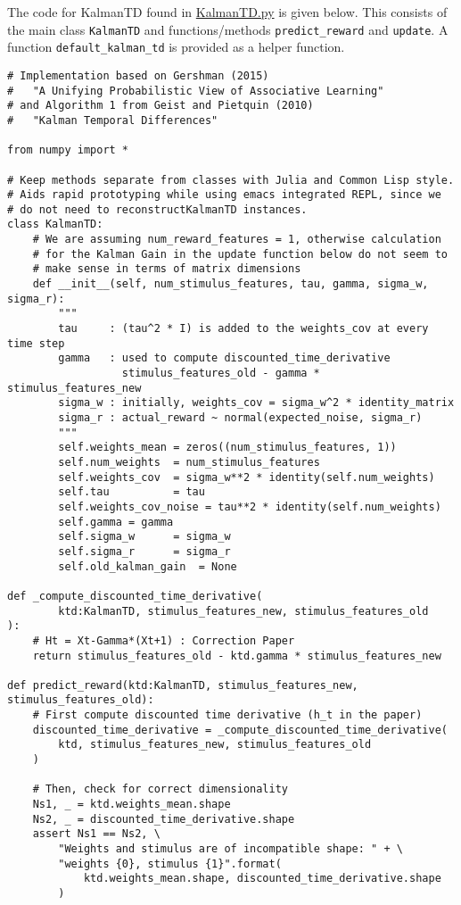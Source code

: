 \documentclass[11pt]{article}
\begin{document}
The code for KalmanTD found in \url{KalmanTD.py} is given below. This consists of the main class \texttt{KalmanTD} and functions/methods \texttt{predict\_reward} and \texttt{update}. A function \texttt{default\_kalman\_td} is provided as a helper function.

\begin{verbatim}
# Implementation based on Gershman (2015)
#   "A Unifying Probabilistic View of Associative Learning"
# and Algorithm 1 from Geist and Pietquin (2010)
#   "Kalman Temporal Differences"

from numpy import *

# Keep methods separate from classes with Julia and Common Lisp style.
# Aids rapid prototyping while using emacs integrated REPL, since we
# do not need to reconstructKalmanTD instances.
class KalmanTD:
    # We are assuming num_reward_features = 1, otherwise calculation
    # for the Kalman Gain in the update function below do not seem to
    # make sense in terms of matrix dimensions
    def __init__(self, num_stimulus_features, tau, gamma, sigma_w, sigma_r):
        """
        tau     : (tau^2 * I) is added to the weights_cov at every time step
        gamma   : used to compute discounted_time_derivative
                  stimulus_features_old - gamma * stimulus_features_new
        sigma_w : initially, weights_cov = sigma_w^2 * identity_matrix
        sigma_r : actual_reward ~ normal(expected_noise, sigma_r)
        """
        self.weights_mean = zeros((num_stimulus_features, 1))
        self.num_weights  = num_stimulus_features
        self.weights_cov  = sigma_w**2 * identity(self.num_weights)
        self.tau          = tau
        self.weights_cov_noise = tau**2 * identity(self.num_weights)
        self.gamma = gamma
        self.sigma_w      = sigma_w
        self.sigma_r      = sigma_r
        self.old_kalman_gain  = None

def _compute_discounted_time_derivative(
        ktd:KalmanTD, stimulus_features_new, stimulus_features_old
):
    # Ht = Xt-Gamma*(Xt+1) : Correction Paper
    return stimulus_features_old - ktd.gamma * stimulus_features_new

def predict_reward(ktd:KalmanTD, stimulus_features_new, stimulus_features_old):
    # First compute discounted time derivative (h_t in the paper)
    discounted_time_derivative = _compute_discounted_time_derivative(
        ktd, stimulus_features_new, stimulus_features_old
    )

    # Then, check for correct dimensionality
    Ns1, _ = ktd.weights_mean.shape
    Ns2, _ = discounted_time_derivative.shape
    assert Ns1 == Ns2, \
        "Weights and stimulus are of incompatible shape: " + \
        "weights {0}, stimulus {1}".format(
            ktd.weights_mean.shape, discounted_time_derivative.shape
        )


\end{verbatim}
\end{document}

